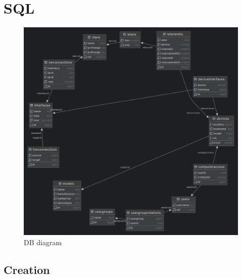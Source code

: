 \documentclass[a4paper,10pt]{article}
\begin{document}
\section{SQL}
\begin{figure}[H]
\centering
\includegraphics[width=15cm]{db.png}
\caption{DB diagram}
\end{figure}
\subsection{Creation}
\end{document}
